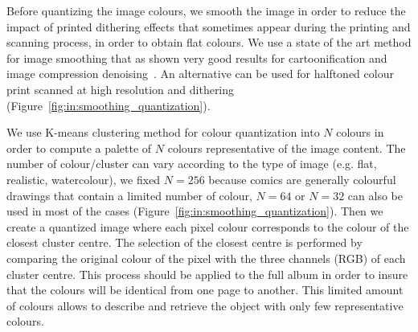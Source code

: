 Before quantizing the image colours, we smooth the image in order to reduce the impact of printed dithering effects that sometimes appear during the printing and scanning process, in order to obtain flat colours.
We use a state of the art method for image smoothing that as shown very good results for cartoonification and image compression denoising~\cite{l0smoothing2011}.
An alternative can be used for halftoned colour print scanned at high resolution and dithering~\cite{Kopf2012DigitalReconstruction} (Figure~\ref{fig:in:smoothing_quantization}).

We use K-means clustering method for colour quantization into $N$ colours in order to compute a palette of $N$ colours representative of the image content.
The number of colour/cluster can vary according to the type of image (e.g. flat, realistic, watercolour), we fixed $N=256$ because comics are generally colourful drawings that contain a limited number of colour, $N=64$ or $N=32$ can also be used in most of the cases (Figure~\ref{fig:in:smoothing_quantization}).
Then we create a quantized image where each pixel colour corresponds to the colour of the closest cluster centre.
The selection of the closest centre is performed by comparing the original colour of the pixel with the three channels (RGB) of each cluster centre.
This process should be applied to the full album in order to insure that the colours will be identical from one page to another.
This limited amount of colours allows to describe and retrieve the object with only few representative colours.


